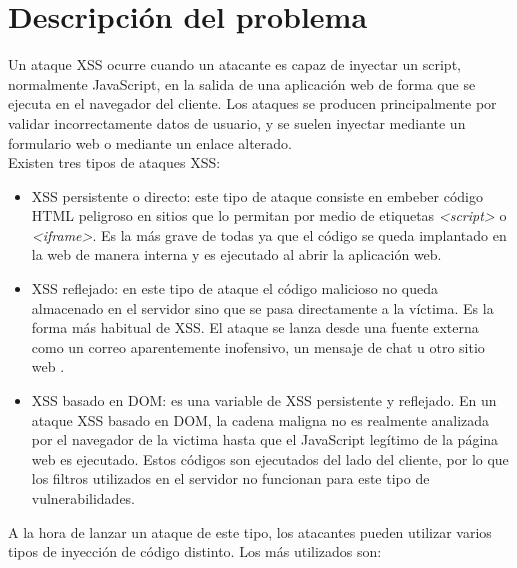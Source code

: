 \section{Descripci\'on del problema}

Un ataque XSS ocurre cuando un atacante es capaz de inyectar un script, normalmente JavaScript, en la salida de una aplicación
web de forma que se ejecuta en el navegador del cliente. Los ataques se producen principalmente por validar incorrectamente datos
de usuario, y se suelen inyectar mediante un formulario web o mediante un enlace alterado.\\

Existen tres tipos de ataques XSS: \\

\begin{itemize}
	\item XSS persistente o directo: este tipo de ataque consiste en embeber código HTML peligroso en sitios que lo permitan por
medio de etiquetas \textit{<script>} o \textit{<iframe>}. Es la más grave de todas ya que el código se queda implantado en la web de
manera interna y es ejecutado al abrir la aplicación web.\\

	\item XSS reflejado: en este tipo de ataque el código malicioso no queda almacenado en el servidor sino que se pasa
directamente a la víctima. Es la forma más habitual de XSS. El ataque se lanza desde una fuente externa como un correo
aparentemente inofensivo, un mensaje de chat u otro sitio web \cite{siete}.\\

	\item XSS basado en DOM: es una variable de XSS persistente y reflejado. En un ataque XSS basado en DOM, la cadena maligna no es realmente analizada por el navegador de la victima hasta que el JavaScript legítimo de la página web es ejecutado. Estos códigos son ejecutados del lado
del cliente, por lo que los filtros utilizados en el servidor no funcionan para este tipo de vulnerabilidades.\\
\end{itemize}

A la hora de lanzar un ataque de este tipo, los atacantes pueden utilizar varios tipos de inyección de código distinto. Los más utilizados son:\\

